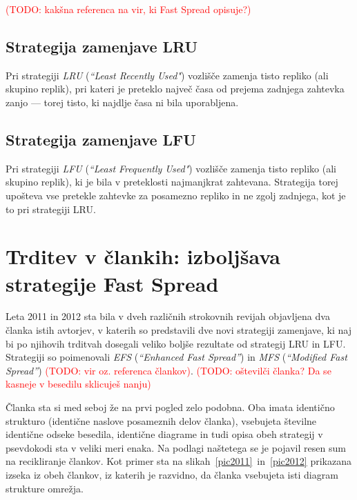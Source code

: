 \documentclass[a4paper, 12pt]{book}
\newcommand{\newterm}{\textit}
\newcommand{\TODO}[1]{\textcolor{red}{(TODO: #1)}}
\begin{document}
\TODO{kakšna referenca na vir, ki Fast Spread opisuje?}

\subsection{Strategija zamenjave LRU}

Pri strategiji \newterm{LRU} (\newterm{``Least Recently Used"}) vozlišče
zamenja tisto repliko (ali skupino replik), pri kateri je preteklo največ
časa od prejema zadnjega zahtevka zanjo --- torej tisto, ki najdlje časa
ni bila uporabljena.

\subsection{Strategija zamenjave LFU}

Pri strategiji \newterm{LFU} (\newterm{``Least Frequently Used"}) vozlišče
zamenja tisto repliko (ali skupino replik), ki je bila v preteklosti
najmanjkrat zahtevana. Strategija torej upošteva vse pretekle zahtevke za
posamezno repliko in ne zgolj zadnjega, kot je to pri strategiji LRU.

\section{Trditev v člankih: izboljšava strategije Fast Spread}

Leta 2011 in 2012 sta bila v dveh različnih strokovnih revijah objavljena
dva članka istih avtorjev, v katerih so predstavili dve novi
strategiji zamenjave, ki naj bi po njihovih trditvah dosegali veliko boljše
rezultate od strategij LRU in LFU. Strategiji
so poimenovali \newterm{EFS} (\newterm{``Enhanced Fast Spread''}) in
\newterm{MFS} (\newterm{``Modified Fast Spread''})
\TODO{vir oz. referenca člankov}. \TODO{oštevilči članka? Da se kasneje v besedilu sklicuješ nanju}

Članka sta si med seboj že na prvi pogled zelo podobna. Oba imata identično
strukturo (identične naslove posameznih delov članka), vsebujeta številne
identične odseke besedila, identične diagrame in tudi opisa obeh strategij
v psevdokodi sta v veliki meri enaka. Na podlagi naštetega se je pojavil
resen sum na recikliranje člankov. Kot primer sta na
slikah~\ref{pic2011}~in~\ref{pic2012} prikazana izseka iz obeh člankov,
iz katerih je razvidno, da članka vsebujeta isti diagram strukture omrežja.
\end{document}
